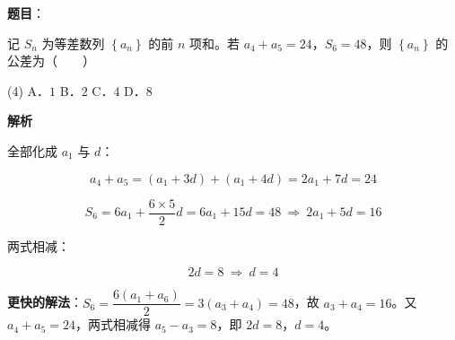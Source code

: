 \begin{answer}

\textbf{题目}：

记 $S_n$ 为等差数列 $\left\{a_n\right\}$ 的前 $n$ 项和。若 $a_4+a_5=24$，$S_6=48$，则 $\left\{a_n\right\}$ 的公差为\mbox{（　　）}

\begin{gkopts}(4)
\task A．$1$
\task B．$2$
\task C．$4$
\task D．$8$
\end{gkopts}

\textbf{解析}

全部化成 $a_1$ 与 $d$：

\nopagebreak[4]
\[a_4+a_5=\left(a_1+3d\right)+\left(a_1+4d\right)=2a_1+7d=24\]

\nopagebreak[4]
\[S_6=6a_1+\frac{6\times5}2d=6a_1+15d=48\ \Longrightarrow\ 2a_1+5d=16\]

两式相减：

\nopagebreak[4]
\[2d=8\ \Longrightarrow\ d=4\]

\begin{gktip}
\textbf{更快的解法}：$S_6=\dfrac{6\left(a_1+a_6\right)}2=3\left(a_3+a_4\right)=48$，故 $a_3+a_4=16$。又 $a_4+a_5=24$，两式相减得 $a_5-a_3=8$，即 $2d=8$，$d=4$。
\end{gktip}


\par\medskip

\end{answer}
